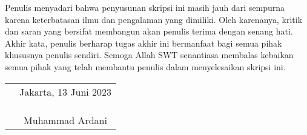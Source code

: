 Penulis menyadari bahwa penyusunan skripsi ini masih jauh dari sempurna karena keterbatasan ilmu dan pengalaman yang dimiliki. Oleh karenanya, kritik dan saran yang bersifat membangun akan penulis terima dengan senang hati. Akhir kata, penulis berharap tugas akhir ini bermanfaat bagi semua pihak khususnya penulis sendiri. Semoga Allah SWT senantiasa membalas kebaikan semua pihak yang telah membantu penulis dalam menyelesaikan skripsi ini.

\vspace{4cm}

\begin{tabular}{p{7.5cm}c}
	&Jakarta, 13 Juni 2023\\
	&\\
	&\\
	&\\
	&Muhammad Ardani
\end{tabular}